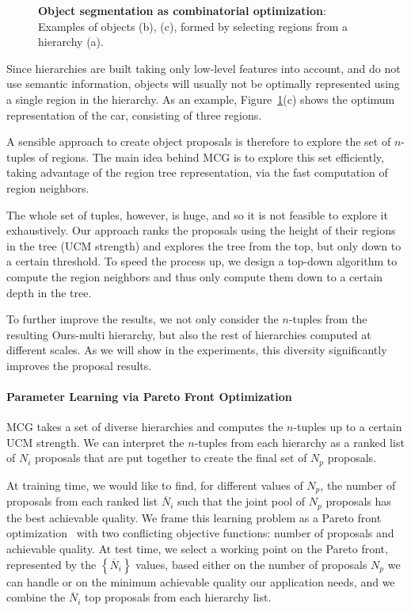 \documentclass[10pt,journal,cspaper,compsoc]{IEEEtran}
\begin{document}
\begin{figure}[h]

\caption{\textbf{Object segmentation as combinatorial optimization}: Examples of objects (b), (c), formed by selecting regions from a hierarchy (a).}
\label{fig:reg_sel_examples}
\end{figure}

Since hierarchies are built taking only low-level features into account, and do not use semantic information,
objects will usually not be optimally represented using a single region in the hierarchy.
As an example, Figure~\ref{fig:reg_sel_examples}(c) shows the optimum representation of the car, consisting of three regions.

A sensible approach to create object proposals is therefore to explore the set of $n$-tuples of regions.
The main idea behind MCG is to explore this set efficiently, taking advantage of the region tree representation,
via the fast computation of region neighbors.

The whole set of tuples, however, is huge, and so it is not feasible to explore it exhaustively.
Our approach ranks the proposals using the height of their regions in the tree (UCM strength)
and explores the tree from the top, but only down to a certain threshold.
To speed the process up, we design a top-down algorithm to compute the region neighbors and thus only
compute them down to a certain depth in the tree.

To further improve the results, we not only consider the $n$-tuples from the resulting Ours-multi hierarchy, but also
the rest of hierarchies computed at different scales.
As we will show in the experiments, this diversity significantly improves the proposal results.



\paragraph*{\textbf{Parameter Learning via Pareto Front Optimization}}
MCG takes a set of diverse hierarchies and computes the $n$-tuples up to a certain UCM strength. 
We can interpret the $n$-tuples from each hierarchy as a ranked list of $N_i$ proposals that are put
together to create the final set of $N_p$ proposals.

At training time, we would like to find, for different values of $N_p$, the number of proposals
from each ranked list $\overline{N}_i$ such that 
the joint pool of $N_p$ proposals has the best achievable quality.
We frame this learning problem as a Pareto front optimization~\cite{Everingham2006,Ehrgott2005} with two conflicting objective functions:
number of proposals and achievable quality.
At test time, we select a working point on the Pareto front, represented by the $\left\{\overline{N}_i\right\}$ values,
based either on the number of proposals $N_p$ we can handle or on the minimum achievable quality our application needs,
and we combine the $\overline{N}_i$ top proposals from each hierarchy list.
\end{document}

